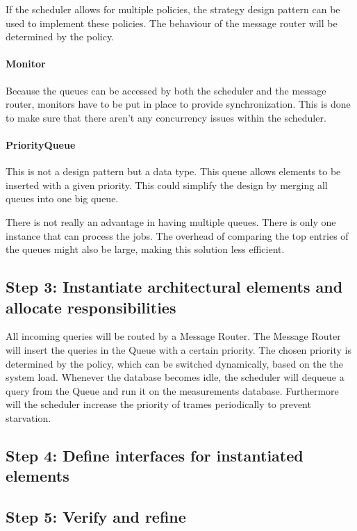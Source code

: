 \npar If the scheduler allows for multiple policies, the strategy design pattern
can be used to implement these policies. The behaviour of the message router
will be determined by the policy.

\paragraph{Monitor} 

\npar Because the queues can be accessed by both the scheduler and the message
router, monitors have to be put in place to provide synchronization. This is
done to make sure that there aren't any concurrency issues within the scheduler. 

\paragraph{PriorityQueue}

\npar This is not a design pattern but a data type. This queue allows elements
to be inserted with a given priority. This could simplify the design by merging
all queues into one big queue.

\npar There is not really an advantage in having multiple queues. There is only
one instance that can process the jobs. The overhead of comparing the top
entries of the queues might also be large, making this solution less efficient. 

\subsection{Step 3: Instantiate architectural elements and allocate responsibilities}
\label{add:it3/elements}

\npar All incoming queries will be routed by a Message Router. The Message
Router will insert the queries in the Queue with a certain priority. The chosen
priority is determined by the policy, which can be switched dynamically, based
on the the system load. Whenever the database becomes idle, the scheduler will
dequeue a query from the Queue and run it on the measurements database.
Furthermore will the scheduler increase the priority of trames periodically to
prevent starvation.

\subsection{Step 4: Define interfaces for instantiated elements}
\label{add:it3/interfaces}


\subsection{Step 5: Verify and refine}
\label{add:it3/verification}

